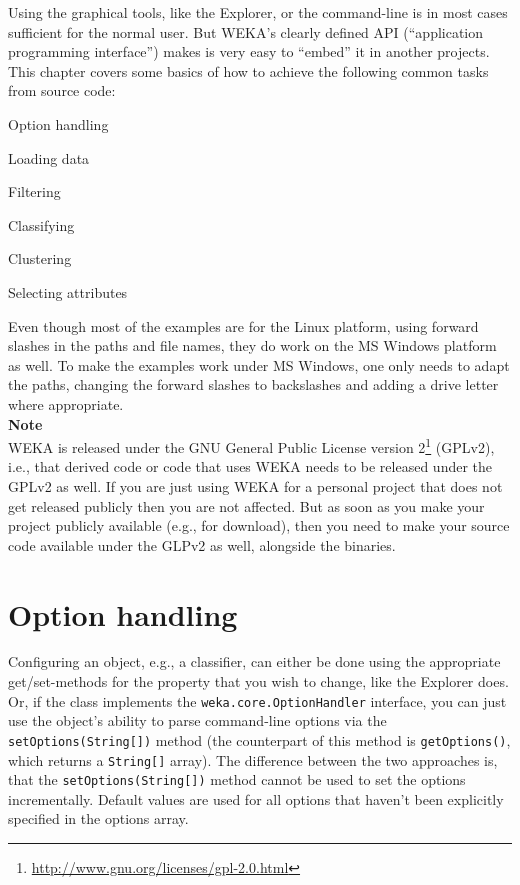 
Using the graphical tools, like the Explorer, or the command-line is in most
cases sufficient for the normal user. But WEKA's clearly defined API
(``application programming interface'') makes is very easy to ``embed'' it in
another projects. This chapter covers some basics of how to achieve the
following common tasks from source code:
\begin{tight_itemize}
	\item Option handling
	\item Loading data
	\item Filtering
	\item Classifying
	\item Clustering
	\item Selecting attributes
\end{tight_itemize}
Even though most of the examples are for the Linux platform, using forward
slashes in the paths and file names, they do work on the MS Windows platform as
well. To make the examples work under MS Windows, one only needs to adapt the
paths, changing the forward slashes to backslashes and adding a drive letter
where appropriate. \\

\noindent \textbf{Note} \\
\noindent WEKA is released under the GNU General Public License version
2\footnote{\url{http://www.gnu.org/licenses/gpl-2.0.html}{}} (GPLv2), i.e., that
derived
code or code that uses WEKA needs to be released under the GPLv2 as well. If
you are just using WEKA for a personal project that does not get released
publicly then you are not affected. But as soon as you make your project
publicly available (e.g., for download), then you need to make your source code
available under the GLPv2 as well, alongside the binaries.

\newpage

\section{Option handling}
Configuring an object, e.g., a classifier, can either be done using the
appropriate get/set-methods for the property that you wish to change, like the
Explorer does. Or, if the class implements the \texttt{weka.core.OptionHandler}
interface, you can just use the object's ability to parse command-line options
via the \texttt{setOptions(String[])} method (the counterpart of this method is
\texttt{getOptions()}, which returns a \texttt{String[]} array). The
difference between the two approaches is, that the \texttt{setOptions(String[])}
method cannot be used to set the options incrementally. Default values are used
for all options that haven't been explicitly specified in the options array.

